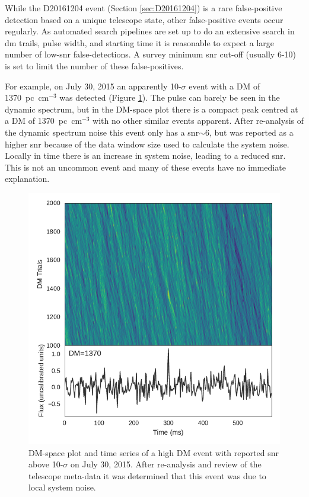 \documentclass[a4paper,fleqn,usenatbib]{mnras}
\begin{document}
While the D20161204 event (Section \ref{sec:D20161204}) is a rare false-positive
detection based on a unique telescope state, other false-positive events occur
regularly.  As automated search pipelines are set up to do an extensive search
in \gls{dm} trails, pulse width, and starting time it is reasonable to expect a
large number of low-\gls{snr} false-detections. A survey minimum \gls{snr}
cut-off (usually 6-10) is set to limit the number of these false-positives.

For example, on July 30, 2015 an apparently 10-$\sigma$ event with a DM of
1370~pc~cm$^{-3}$ was detected (Figure \ref{fig:D20150730}). The pulse can
barely be seen in the dynamic spectrum, but in the DM-space plot there is a
compact peak centred at a DM of 1370~pc~cm$^{-3}$ with no other similar events
apparent.  After re-analysis of the dynamic spectrum noise this event only has a
\gls{snr}$\sim$6, but was reported as a higher \gls{snr} because of the data
window size used to calculate the system noise.  Locally in time there is an
increase in system noise, leading to a reduced \gls{snr}.  This is not an
uncommon event and many of these events have no immediate explanation.

\begin{figure}
    \includegraphics[width=1.0\linewidth]{figures/D20150730_buf23_Beam6_dmtrial.pdf}
    \caption{DM-space plot and time series of a high DM event with reported
    \gls{snr} above 10-$\sigma$ on July 30, 2015. After re-analysis and review
    of the telescope meta-data it was determined that this event was due to
    local system noise.
    }
    \label{fig:D20150730}
\end{figure}
\end{document}
